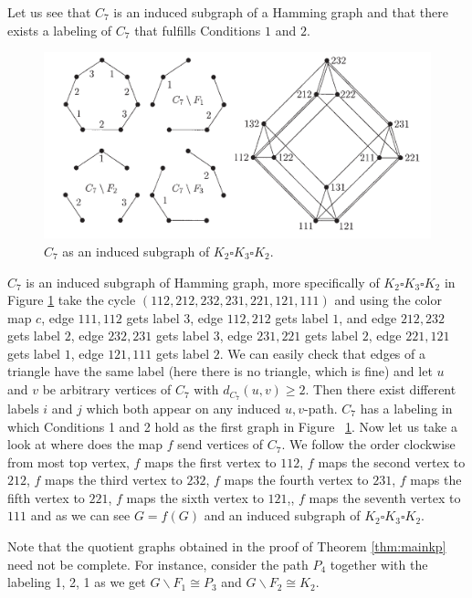\documentclass[12pt,a4paper,titlepage,openany]{report}
\begin{document}
\begin{example} Let us see that $C_7$ is an induced subgraph of a Hamming graph and that there exists a labeling of $C_7$ that fulfills Conditions $1$ and $2$.
\begin{figure}[h!]
\begin{center}
\includegraphics[width=1\linewidth]{figures/c_7inducedhamming.png}
\end{center}
\caption{$C_7$ as an induced subgraph of $K_2\square K_3\square K_2$.}\label{fig:c7induced}
\end{figure}
\newline
$C_7$ is an induced subgraph of Hamming graph, more specifically of $K_2\square K_3\square K_2$ in Figure \ref{fig:c7induced} take the cycle $(112,212,232,231,221,121,111)$ and using the color map $c$, edge $111,112$ gets label $3$, edge $112,212$ gets label $1$, and edge $212,232$ gets label $2$, edge $232,231$ gets label $3$, edge $231,221$ gets label $2$, edge $221,121$ gets label $1$, edge $121,111$ gets label $2$. We can easily check that edges of a triangle have the same label (here there is no triangle, which is fine) and let $u$ and $v$ be arbitrary vertices of $C_7$ with $d_{C_7}(u,v) \geq 2$. Then there exist different labels $i$ and $j$ which both appear on any induced $u, v$-path.\newline
$C_7$ has a labeling in which Conditions 1 and 2 hold as the first graph in Figure ~\ref{fig:c7induced}. Now let us take a look at where does the map $f$ send vertices of $C_7$. We follow the order clockwise from most top vertex, $f$ maps the first vertex to $112$, $f$ maps the second vertex to $212$, $f$ maps the third vertex to $232$, $f$ maps the fourth vertex to $231$, $f$ maps the fifth vertex to $221$, $f$ maps the sixth vertex to $121$,, $f$ maps the seventh vertex to $111$ and as we can see $G=f(G)$ and an induced subgraph of $K_2\square K_3\square K_2$.
\end{example}
Note that the quotient graphs obtained in the proof of Theorem \ref{thm:mainkp} need not be complete. For instance, consider the path $P_4$ together with the labeling 1, 2, 1 as we get $G\backslash F_1\cong P_3$ and $G\backslash F_2\cong K_2$.
\end{document}
